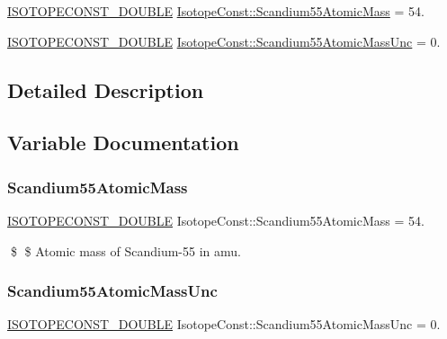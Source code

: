 \begin{DoxyCompactItemize}
\item 
\mbox{\hyperlink{group___isotope_const-_macros_ga8f45a7272ce02c0b4c65c44636ed719a}{I\+S\+O\+T\+O\+P\+E\+C\+O\+N\+S\+T\+\_\+\+D\+O\+U\+B\+LE}} \mbox{\hyperlink{group___isotope_const-_scandium-_sc55_gacd12d509a76af556df36c21ccee1d1b9}{Isotope\+Const\+::\+Scandium55\+Atomic\+Mass}} = 54.
\item 
\mbox{\hyperlink{group___isotope_const-_macros_ga8f45a7272ce02c0b4c65c44636ed719a}{I\+S\+O\+T\+O\+P\+E\+C\+O\+N\+S\+T\+\_\+\+D\+O\+U\+B\+LE}} \mbox{\hyperlink{group___isotope_const-_scandium-_sc55_ga245bd2c64d322aa725caba7af24b1989}{Isotope\+Const\+::\+Scandium55\+Atomic\+Mass\+Unc}} = 0.
\end{DoxyCompactItemize}


\subsection{Detailed Description}


\subsection{Variable Documentation}
\mbox{\label{group___isotope_const-_scandium-_sc55_gacd12d509a76af556df36c21ccee1d1b9}} 
\subsubsection{\texorpdfstring{Scandium55\+Atomic\+Mass}{Scandium55AtomicMass}}
{\footnotesize\ttfamily \mbox{\hyperlink{group___isotope_const-_macros_ga8f45a7272ce02c0b4c65c44636ed719a}{I\+S\+O\+T\+O\+P\+E\+C\+O\+N\+S\+T\+\_\+\+D\+O\+U\+B\+LE}} Isotope\+Const\+::\+Scandium55\+Atomic\+Mass = 54.}

\$ \$ Atomic mass of Scandium-\/55 in amu. \mbox{\label{group___isotope_const-_scandium-_sc55_ga245bd2c64d322aa725caba7af24b1989}} 
\subsubsection{\texorpdfstring{Scandium55\+Atomic\+Mass\+Unc}{Scandium55AtomicMassUnc}}
{\footnotesize\ttfamily \mbox{\hyperlink{group___isotope_const-_macros_ga8f45a7272ce02c0b4c65c44636ed719a}{I\+S\+O\+T\+O\+P\+E\+C\+O\+N\+S\+T\+\_\+\+D\+O\+U\+B\+LE}} Isotope\+Const\+::\+Scandium55\+Atomic\+Mass\+Unc = 0.}

